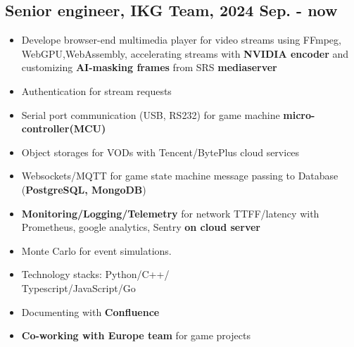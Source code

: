 \documentclass[11pt]{article}
\begin{document}
\begin{multicols*}{2}

\vspace{0.5em}

\subsection*{Senior engineer, IKG Team, 2024 Sep. - now}
\begin{itemize}[noitemsep]
    \item Develope browser-end multimedia player for video streams using FFmpeg, WebGPU,WebAssembly, accelerating streams with \textbf{NVIDIA encoder} and customizing\textbf{ AI-masking frames} from SRS\textbf{ mediaserver} 
    \item Authentication for stream requests
    \item Serial port communication (USB, RS232) for game machine \textbf{micro-controller(MCU)}
    \item Object storages for VODs with Tencent/BytePlus cloud services
    \item Websockets/MQTT for game state machine message passing to Database (\textbf{PostgreSQL, MongoDB})
    \item \textbf{Monitoring/Logging/Telemetry} for network TTFF/latency with Prometheus, google analytics, Sentry \textbf{on cloud server}
    \item Monte Carlo for event simulations.
    \item Technology stacks: Python/C++/\\Typescript/JavaScript/Go 
    \item Documenting with \textbf{Confluence}
    \item \textbf{Co-working with Europe team} for game projects
\end{itemize}


\end{multicols*}
\end{document}
